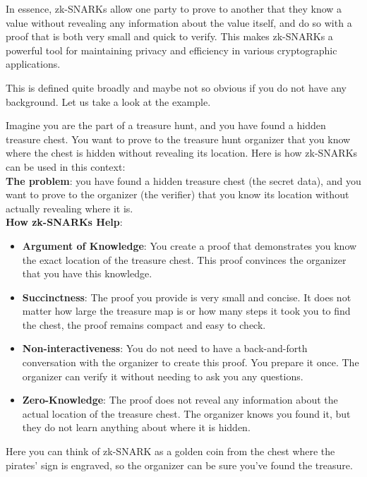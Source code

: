 \documentclass[../../book.tex]{subfiles}
\begin{document}
In essence, zk-SNARKs allow one party to prove to another that they know a value without revealing 
any information about the value itself, and do so with a proof that is both very small and quick to 
verify. This makes zk-SNARKs a powerful tool for maintaining privacy and efficiency in various 
cryptographic applications.

This is defined quite broadly and maybe not so obvious if you do not have any background. Let us take a
look at the example.

\begin{intuition}
    Imagine you are the part of a treasure hunt, and you have found a hidden treasure chest. You want to 
    prove to the treasure hunt organizer that you know where the chest is hidden without revealing
    its location. Here is how zk-SNARKs can be used in this context: \\

    \textbf{The problem}: you have found a hidden treasure chest (the secret data), and you want to
    prove to the organizer (the verifier) that you know its location without actually revealing 
    where it is. \\

    \textbf{How zk-SNARKs Help}:

    \begin{itemize}
        \item \textbf{Argument of Knowledge}: You create a proof that demonstrates you know the exact
        location of the treasure chest. This proof convinces the organizer that you have this 
        knowledge.
        \item \textbf{Succinctness}: The proof you provide is very small and concise. It does not matter how
        large the treasure map is or how many steps it took you to find the chest, the proof remains
        compact and easy to check.
        \item \textbf{Non-interactiveness}: You do not need to have a back-and-forth conversation with the 
        organizer to create this proof. You prepare it once. The organizer can verify it without 
        needing to ask you any questions.
        \item \textbf{Zero-Knowledge}: The proof does not reveal any information about the actual location of
        the treasure chest. The organizer knows you found it, but they do not learn anything about 
        where it is hidden. \\
    \end{itemize}

    Here you can think of zk-SNARK as a golden coin from the chest where the pirates' sign is 
    engraved, so the organizer can be sure you've found the treasure.
\end{intuition}
\end{document}
